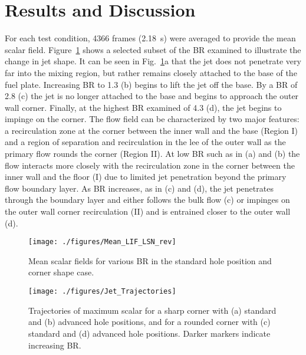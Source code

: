 \documentclass[10pt, twocolumn]{article}
\begin{document}
\section*{Results and Discussion} 
For each test condition, 4366 frames (2.18~s) were averaged to provide the mean scalar field. Figure~\ref{fig:mean_field} shows a selected subset of the BR examined to illustrate the change in jet shape. It can be seen in Fig.~\ref{fig:mean_field}a that the jet does not penetrate very far into the mixing region, but rather remains closely attached to the base of the fuel plate. Increasing BR to 1.3 (b) begins to lift the jet off the base. By a BR of 2.8 (c) the jet is no longer attached to the base and begins to approach the outer wall corner. Finally, at the highest BR examined of 4.3 (d), the jet begins to impinge on the corner. The flow field can be characterized by two major features: a recirculation zone at the corner between the inner wall and the base (Region I) and a region of separation and recirculation in the lee of the outer wall as the primary flow rounds the corner (Region II). At low BR such as in (a) and (b) the flow interacts more closely with the recirculation zone in the corner between the inner wall and the floor (I) due to limited jet penetration beyond the primary flow boundary layer. As BR increases, as in (c) and (d), the jet penetrates through the boundary layer and either follows the bulk flow (c) or impinges on the outer wall corner recirculation (II) and is entrained closer to the outer wall (d).

\begin{figure}[t!]
	\centering
	\texttt{[image: ./figures/Mean\_LIF\_LSN\_rev]}
	\caption{Mean scalar fields for various BR in the standard hole position and corner shape case.}
	\label{fig:mean_field}
\end{figure}

\begin{figure}[b!]
	\centering
	\texttt{[image: ./figures/Jet\_Trajectories]}
	\caption{Trajectories of maximum scalar for a sharp corner with (a) standard and (b) advanced hole positions, and for a rounded corner with (c) standard and (d) advanced hole positions. Darker markers indicate increasing BR.}
	\label{fig:traj}
\end{figure}
\end{document}
